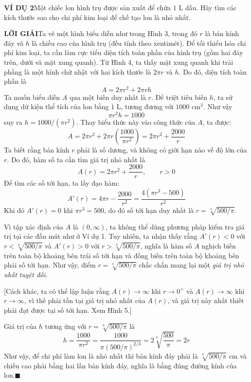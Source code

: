 \documentclass[11pt]{article}
\begin{document}
\begin{minipage}[t]{0.725\textwidth}
  \vspace{0pt}
  \noindent
  \textbf{\textsf{\color{stewartcyan}VÍ DỤ 2}}\quad Một chiếc lon hình trụ được sản xuất để chứa $1\text{ L}$ dầu. Hãy tìm các kích thước sao cho chi phí kim loại để chế tạo lon là nhỏ nhất.

  \vspace{6pt}
  \noindent
  \textbf{\textsf{\color{stewartcyan}LỜI GIẢI}}\quad Ta vẽ một hình biểu diễn như trong Hình 3, trong đó $r$ là bán kính đáy và $h$ là chiều cao của hình trụ (đều tính theo xentimét). Để tối thiểu hóa chi phí kim loại, ta cần làm cực tiểu diện tích toàn phần của hình trụ (gồm hai đáy trên, dưới và mặt xung quanh). Từ Hình 4, ta thấy mặt xung quanh khi trải phẳng là một hình chữ nhật với hai kích thước là $2\pi r$ và $h$. Do đó, diện tích toàn phần là
  \[
    A = 2\pi r^2 + 2\pi rh
  \]
  Ta muốn biểu diễn $A$ qua một biến duy nhất là $r$. Để triệt tiêu biến $h$, ta sử dụng dữ kiện thể tích của lon bằng $1\text{ L}$, tương đương với $1000\text{ cm}^3$. Như vậy
  \[
    \pi r^2 h = 1000
  \]
  \noindent
  suy ra $h = 1000/(\pi r^2)$. Thay biểu thức này vào công thức của $A$, ta được:
  \[
    A = 2\pi r^2 + 2\pi r \left( \frac{1000}{\pi r^2} \right) = 2\pi r^2 + \frac{2000}{r}
  \]
  Ta biết rằng bán kính $r$ phải là số dương, và không có giới hạn nào về độ lớn của $r$. Do đó, hàm số ta cần tìm giá trị nhỏ nhất là
  \[
    A(r) = 2\pi r^2 + \frac{2000}{r}, \qquad r > 0
  \]
  Để tìm các số tới hạn, ta lấy đạo hàm:
  \[
    A'(r) = 4\pi r - \frac{2000}{r^2} = \frac{4(\pi r^3 - 500)}{r^2}
  \]
  Khi đó $A'(r) = 0$ khi $\pi r^3 = 500$, do đó số tới hạn duy nhất là $r = \sqrt[3]{500/\pi}$.

  Vì tập xác định của $A$ là $(0, \infty)$, ta không thể dùng phương pháp kiểm tra giá trị tại các đầu mút như ở Ví dụ 1. Tuy nhiên, ta nhận thấy rằng $A'(r) < 0$ với $r < \sqrt[3]{500/\pi}$ và $A'(r) > 0$ với $r > \sqrt[3]{500/\pi}$, nghĩa là hàm số $A$ nghịch biến trên toàn bộ khoảng bên trái số tới hạn và đồng biến trên toàn bộ khoảng bên phải số tới hạn. Như vậy, điểm $r = \sqrt[3]{500/\pi}$ chắc chắn mang lại một \textit{giá trị nhỏ nhất tuyệt đối}.

  [Cách khác, ta có thể lập luận rằng $A(r) \to \infty$ khi $r \to 0^+$ và $A(r) \to \infty$ khi $r \to \infty$, vì thế phải tồn tại giá trị nhỏ nhất của $A(r)$, và giá trị này nhất thiết phải đạt được tại số tới hạn. Xem Hình 5.]

  Giá trị của $h$ tương ứng với $r = \sqrt[3]{500/\pi}$ là
  \[
    h = \frac{1000}{\pi r^2} = \frac{1000}{\pi (500/\pi)^{2/3}} = 2\sqrt[3]{\frac{500}{\pi}} = 2r
  \]
  Như vậy, để chi phí làm lon là nhỏ nhất thì bán kính đáy phải là $\sqrt[3]{500/\pi}\text{ cm}$ và chiều cao phải bằng hai lần bán kính đáy, nghĩa là bằng đúng đường kính của lon.\hfill{\color{stewartcyan}$\blacksquare$}


\end{minipage}
\end{document}
